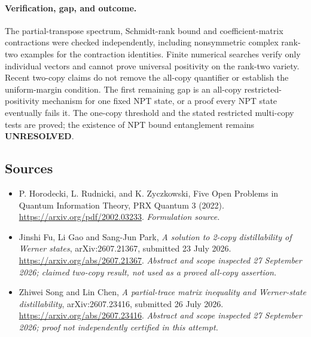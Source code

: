 \documentclass[11pt]{article}
\begin{document}
\paragraph{Verification, gap, and outcome.}
The partial-transpose spectrum, Schmidt-rank bound and coefficient-matrix
contractions were checked independently, including nonsymmetric complex
rank-two examples for the contraction identities. Finite numerical
searches verify only individual vectors and cannot prove universal
positivity on the rank-two variety. Recent two-copy claims do not remove
the all-copy quantifier or establish the uniform-margin condition.
The first remaining gap is an all-copy restricted-positivity mechanism
for one fixed NPT state, or a proof every NPT state eventually fails it.
The one-copy threshold and the stated restricted multi-copy tests are
proved; the existence of NPT bound entanglement remains
\textbf{UNRESOLVED}.

\subsection{Sources}
\begin{itemize}
\item[S1]P. Horodecki, L. Rudnicki, and K. Zyczkowski, Five Open Problems in Quantum Information Theory, PRX Quantum 3 (2022).
\url{https://arxiv.org/pdf/2002.03233}.
\textit{Formulation source.}
\item[E1]Jinshi Fu, Li Gao and Sang-Jun Park, \emph{A solution to 2-copy distillability of Werner states}, arXiv:2607.21367, submitted 23 July 2026.
\url{https://arxiv.org/abs/2607.21367}.
\textit{Abstract and scope inspected 27 September 2026; claimed two-copy result, not used as a proved all-copy assertion.}
\item[E2]Zhiwei Song and Lin Chen, \emph{A partial-trace matrix inequality and Werner-state distillability}, arXiv:2607.23416, submitted 26 July 2026.
\url{https://arxiv.org/abs/2607.23416}.
\textit{Abstract and scope inspected 27 September 2026; proof not independently certified in this attempt.}
\end{itemize}
\end{document}
